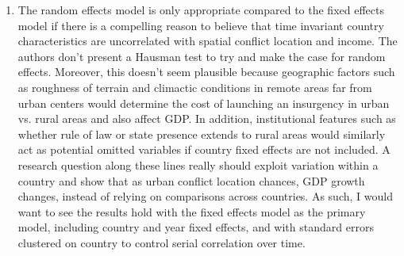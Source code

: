 \begin{enumerate}
\item The random effects model is only appropriate compared to the fixed effects model if there is a compelling reason to believe that time invariant country characteristics are uncorrelated with spatial conflict location and income. The authors don’t present a Hausman test to try and make the case for random effects. Moreover, this doesn’t seem plausible because geographic factors such as roughness of terrain and climactic conditions in remote areas far from urban centers would determine the cost of launching an insurgency in urban vs. rural areas and also affect GDP. In addition, institutional features such as whether rule of law or state presence extends to rural areas would similarly act as potential omitted variables if country fixed effects are not included. A research question along these lines really should exploit variation within a country and show that as urban conflict location chances, GDP growth changes, instead of relying on comparisons across countries. As such, I would want to see the results hold with the fixed effects model as the primary model, including country and year fixed effects, and with standard errors clustered on country to control serial correlation over time.


\end{enumerate}
